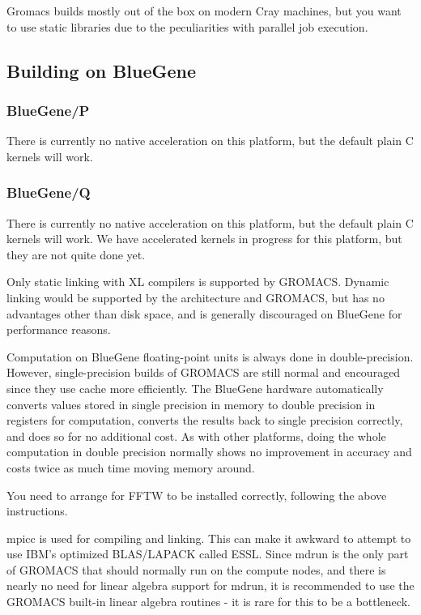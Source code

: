 \documentclass{article}[12pt,a4paper,twoside]
\newcommand{\gromacs}{GROMACS}
\begin{document}
Gromacs builds mostly out of the box on modern Cray machines,
but you want to use static libraries due to the peculiarities with
parallel job execution.

\subsection{Building on BlueGene}

\subsubsection{BlueGene/P}

There is currently no native acceleration on this platform, but the
default plain C kernels will work.

\subsubsection{BlueGene/Q}

There is currently no native acceleration on this platform, but the
default plain C kernels will work. We have accelerated kernels in
progress for this platform, but they are not quite done yet.

Only static linking with XL compilers is supported by \gromacs{}. Dynamic
linking would be supported by the architecture and \gromacs{}, but has no
advantages other than disk space, and is generally discouraged on
BlueGene for performance reasons.

Computation on BlueGene floating-point units is always done in
double-precision. However, single-precision builds of \gromacs{} are
still normal and encouraged since they use cache more efficiently. 
The BlueGene hardware automatically
converts values stored in single precision in memory to double
precision in registers for computation, converts the results back to
single precision correctly, and does so for no additional cost. As
with other platforms, doing the whole computation in double precision
normally shows no improvement in accuracy and costs twice as much time
moving memory around.

You need to arrange for FFTW to be installed correctly, following the
above instructions.

mpicc is used for compiling and linking. This can make it awkward to
attempt to use IBM's optimized BLAS/LAPACK called ESSL. Since mdrun is
the only part of \gromacs{} that should normally run on the compute
nodes, and there is nearly no need for linear algebra support for
mdrun, it is recommended to use the \gromacs{} built-in linear algebra
routines - it is rare for this to be a bottleneck.
\end{document}
